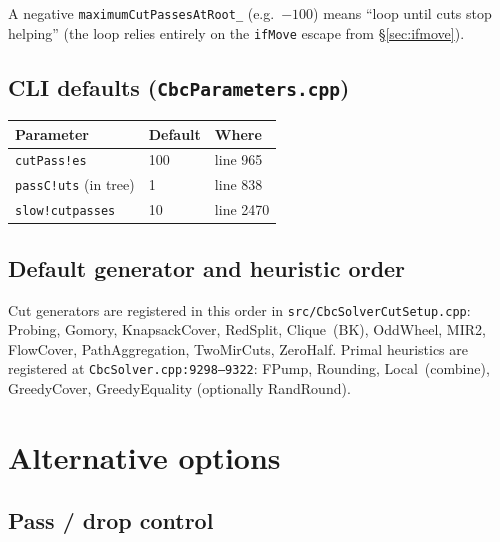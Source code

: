 \documentclass[11pt,a4paper]{article}
\begin{document}
A negative \texttt{maximumCutPassesAtRoot\_} (e.g.\ $-100$) means
``loop until cuts stop helping'' (the loop relies entirely on the
\texttt{ifMove} escape from \S\ref{sec:ifmove}).

\subsection*{CLI defaults (\texttt{CbcParameters.cpp})}

\begin{tabular}{lll}
\toprule
Parameter            & Default & Where\\
\midrule
\texttt{cutPass!es}        & 100 & line 965\\
\texttt{passC!uts} (in tree) & 1 & line 838\\
\texttt{slow!cutpasses}    & 10  & line 2470\\
\bottomrule
\end{tabular}

\subsection*{Default generator and heuristic order}

Cut generators are registered in this order in
\texttt{src/CbcSolverCutSetup.cpp}: Probing, Gomory, KnapsackCover,
RedSplit, Clique~(BK), OddWheel, MIR2, FlowCover, PathAggregation,
TwoMirCuts, ZeroHalf.  Primal
heuristics are registered at \texttt{CbcSolver.cpp:9298--9322}:
FPump, Rounding, Local~(combine), GreedyCover, GreedyEquality
(optionally RandRound).

\section{Alternative options}
\label{sec:alternatives}

\subsection*{Pass / drop control}
\end{document}
